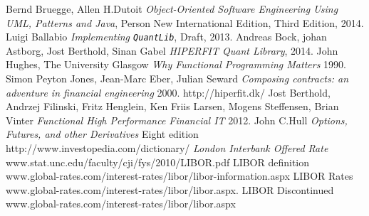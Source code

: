 \documentclass{article}
\newcommand{\QL}{\texttt{QuantLib}}
\theoremstyle{definition}
\begin{document}
\begin{thebibliography}{9}
    Bernd Bruegge, Allen H.Dutoit
    \emph{Object-Oriented Software Engineering Using UML, Patterns and Java},
    Person New International Edition,
    Third Edition,
    2014.
    Luigi Ballabio
    \emph{Implementing \QL},
    Draft,
    2013.
    Andreas Bock, johan Astborg, Jost Berthold, Sinan Gabel
    \emph{HIPERFIT Quant Library},
    2014.
    John Hughes, The University Glasgow
    \emph{Why Functional Programming Matters} 
    1990.
    Simon Peyton Jones, Jean-Marc Eber, Julian Seward
    \emph{Composing contracts: an adventure in financial engineering}
    2000.
    http://hiperfit.dk/
    Jost Berthold, Andrzej Filinski, Fritz Henglein, Ken Friis Larsen, Mogens Steffensen, Brian Vinter
    \emph{Functional High Performance Financial IT}
    2012.
    John C.Hull
    \emph{Options, Futures, and other Derivatives}
    Eight edition
    http://www.investopedia.com/dictionary/
    \emph{London Interbank Offered Rate}
    www.stat.unc.edu/faculty/cji/fys/2010/LIBOR.pdf
    LIBOR definition
    www.global-rates.com/interest-rates/libor/libor-information.aspx
    LIBOR Rates
    www.global-rates.com/interest-rates/libor/libor.aspx.
    LIBOR Discontinued
    www.global-rates.com/interest-rates/libor/libor.aspx
\end{thebibliography}
\end{document}
